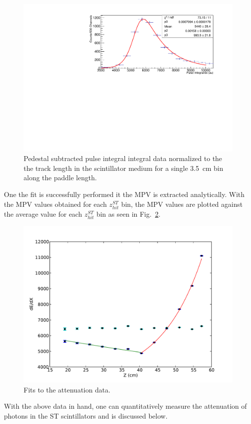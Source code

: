 	\begin{figure}[!htb]
	\centering
	\includegraphics[width=1.0\columnwidth]{calibration/figs/PiFit_sector15_int3}
	\caption{Pedestal subtracted pulse integral integral data normalized to the the track length in the scintillator medium for a single 3.5~cm bin along the paddle length.}
	\label{fig:mpv_fit}
	\end{figure}
One the fit is successfully performed it the MPV is extracted analytically. With the MPV values obtained for each $z^{ST}_{hit}$ bin, the MPV values are plotted against the average value for each $z^{ST}_{hit}$ bin as seen in Fig.~\ref{fig:attfits}.
\begin{figure}[!htb]
	\centering
	\includegraphics[width=1.0\columnwidth]{calibration/figs/Att_Fit15}
	\caption{Fits to the attenuation data.}
	\label{fig:attfits}
\end{figure}
With the above data in hand, one can quantitatively measure the attenuation of photons in the ST scintillators and is discussed below.
	
